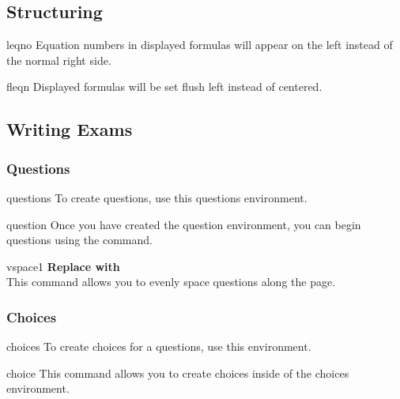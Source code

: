 	\subsection{Structuring}
		\begin{docCommand}{leqno}{}
			Equation numbers in displayed formulas will appear on the left instead of the normal right side.
		\end{docCommand}
		\begin{docCommand}{fleqn}{}
			Displayed formulas will be set flush left instead of centered.
		\end{docCommand}
	\subsection{Writing Exams}\label{subsec:writingexams}
		\subsubsection{Questions}
			\begin{docEnvironment}{questions}{}\label{questionenv}
				To create questions, use this questions environment. 
			\end{docEnvironment}
			\begin{docCommand}{question}{}
				Once you have created the question environment, you can begin questions using the  command.
			\end{docCommand}
			\begin{docCommand}{vspace1}{}
			    \textbf{Replace  with }\\
				This command allows you to evenly space questions along the page.
			\end{docCommand}
		\subsubsection{Choices}
			\begin{docEnvironment}{choices}{}
				To create choices for a questions, use this environment. 
			\end{docEnvironment}
			\begin{docCommand}{choice}{}
				This command allows you to create choices inside of the choices environment.
			\end{docCommand}
